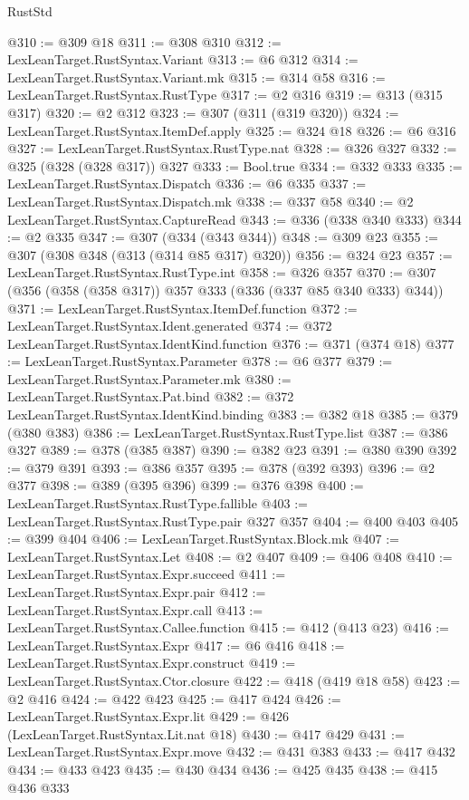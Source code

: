 \begin{lexlean}{RustStd}
\begin{coremodule}
@310 := @309 @18
@311 := @308 @310
@312 := LexLeanTarget.RustSyntax.Variant
@313 := @6 @312
@314 := LexLeanTarget.RustSyntax.Variant.mk
@315 := @314 @58
@316 := LexLeanTarget.RustSyntax.RustType
@317 := @2 @316
@319 := @313 (@315 @317)
@320 := @2 @312
@323 := @307 (@311 (@319 @320))
@324 := LexLeanTarget.RustSyntax.ItemDef.apply
@325 := @324 @18
@326 := @6 @316
@327 := LexLeanTarget.RustSyntax.RustType.nat
@328 := @326 @327
@332 := @325 (@328 (@328 @317)) @327
@333 := Bool.true
@334 := @332 @333
@335 := LexLeanTarget.RustSyntax.Dispatch
@336 := @6 @335
@337 := LexLeanTarget.RustSyntax.Dispatch.mk
@338 := @337 @58
@340 := @2 LexLeanTarget.RustSyntax.CaptureRead
@343 := @336 (@338 @340 @333)
@344 := @2 @335
@347 := @307 (@334 (@343 @344))
@348 := @309 @23
@355 := @307 (@308 @348 (@313 (@314 @85 @317) @320))
@356 := @324 @23
@357 := LexLeanTarget.RustSyntax.RustType.int
@358 := @326 @357
@370 := @307 (@356 (@358 (@358 @317)) @357 @333 (@336 (@337 @85 @340 @333) @344))
@371 := LexLeanTarget.RustSyntax.ItemDef.function
@372 := LexLeanTarget.RustSyntax.Ident.generated
@374 := @372 LexLeanTarget.RustSyntax.IdentKind.function
@376 := @371 (@374 @18)
@377 := LexLeanTarget.RustSyntax.Parameter
@378 := @6 @377
@379 := LexLeanTarget.RustSyntax.Parameter.mk
@380 := LexLeanTarget.RustSyntax.Pat.bind
@382 := @372 LexLeanTarget.RustSyntax.IdentKind.binding
@383 := @382 @18
@385 := @379 (@380 @383)
@386 := LexLeanTarget.RustSyntax.RustType.list
@387 := @386 @327
@389 := @378 (@385 @387)
@390 := @382 @23
@391 := @380 @390
@392 := @379 @391
@393 := @386 @357
@395 := @378 (@392 @393)
@396 := @2 @377
@398 := @389 (@395 @396)
@399 := @376 @398
@400 := LexLeanTarget.RustSyntax.RustType.fallible
@403 := LexLeanTarget.RustSyntax.RustType.pair @327 @357
@404 := @400 @403
@405 := @399 @404
@406 := LexLeanTarget.RustSyntax.Block.mk
@407 := LexLeanTarget.RustSyntax.Let
@408 := @2 @407
@409 := @406 @408
@410 := LexLeanTarget.RustSyntax.Expr.succeed
@411 := LexLeanTarget.RustSyntax.Expr.pair
@412 := LexLeanTarget.RustSyntax.Expr.call
@413 := LexLeanTarget.RustSyntax.Callee.function
@415 := @412 (@413 @23)
@416 := LexLeanTarget.RustSyntax.Expr
@417 := @6 @416
@418 := LexLeanTarget.RustSyntax.Expr.construct
@419 := LexLeanTarget.RustSyntax.Ctor.closure
@422 := @418 (@419 @18 @58)
@423 := @2 @416
@424 := @422 @423
@425 := @417 @424
@426 := LexLeanTarget.RustSyntax.Expr.lit
@429 := @426 (LexLeanTarget.RustSyntax.Lit.nat @18)
@430 := @417 @429
@431 := LexLeanTarget.RustSyntax.Expr.move
@432 := @431 @383
@433 := @417 @432
@434 := @433 @423
@435 := @430 @434
@436 := @425 @435
@438 := @415 @436 @333

\end{coremodule}
\end{lexlean}
